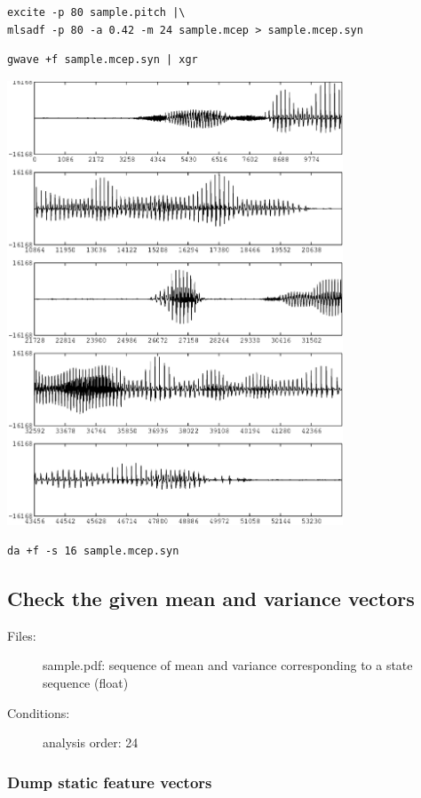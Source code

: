 \documentclass[a4paper,10pt]{article}
\begin{document}
\begin{verbatim}
excite -p 80 sample.pitch |\
mlsadf -p 80 -a 0.42 -m 24 sample.mcep > sample.mcep.syn
\end{verbatim}

\begin{verbatim}
gwave +f sample.mcep.syn | xgr
\end{verbatim}

\includegraphics[width=10cm]{sample.mcep.syn.gwave.eps}

\begin{verbatim}
da +f -s 16 sample.mcep.syn
\end{verbatim}

\subsection{Check the given mean and variance vectors}

\begin{description}
\item[Files:]
  sample.pdf: sequence of mean and variance
              corresponding to a state sequence (float)
\item[Conditions:]
  analysis order: 24
\end{description}

\subsubsection{Dump static feature vectors}
\end{document}
